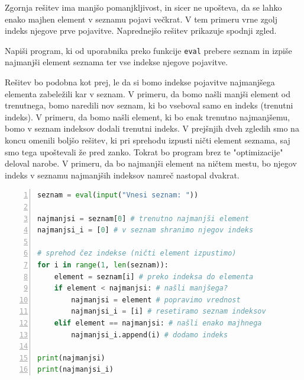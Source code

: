 Zgornja rešitev ima manjšo pomanjkljivost, in sicer ne upošteva, da se lahko enako majhen element v seznamu pojavi večkrat. V tem primeru vrne zgolj indeks njegove prve pojavitve. Naprednejšo rešitev prikazuje spodnji zgled.

\begin{zgled}
Napiši program, ki od uporabnika preko funkcije \texttt{eval} prebere seznam in izpiše najmanjši element seznama ter vse indekse njegove pojavitve. 
\end{zgled}
\begin{resitev}
Rešitev bo podobna kot prej, le da si bomo indekse pojavitve najmanjšega elementa zabeležili kar v seznam. V primeru, da bomo našli manjši element od trenutnega, bomo naredili nov seznam, ki bo vseboval samo en indeks (trenutni indeks). V primeru, da bomo našli element, ki bo enak trenutno najmanjšemu, bomo v seznam indeksov dodali trenutni indeks. V prejšnjih dveh zgledih smo na koncu omenili boljšo rešitev, ki pri sprehodu izpusti ničti element seznama, saj smo tega upoštevali že pred zanko. Tokrat bo program brez te "optimizacije" deloval narobe. V primeru, da bo najmanjši element na ničtem mestu, bo njegov indeks v seznamu najmanjših indeksov namreč nastopal dvakrat.
\begin{lstlisting}[language=Python,numbers=left]
seznam = eval(input("Vnesi seznam: "))

najmanjsi = seznam[0] # trenutno najmanjši element
najmanjsi_i = [0] # v seznam shranimo njegov indeks

# sprehod čez indekse (ničti element izpustimo)
for i in range(1, len(seznam)): 
    element = seznam[i] # preko indeksa do elementa
    if element < najmanjsi: # našli manjšega?
        najmanjsi = element # popravimo vrednost
        najmanjsi_i = [i] # resetiramo seznam indeksov
    elif element == najmanjsi: # našli enako majhnega
        najmanjsi_i.append(i) # dodamo indeks

print(najmanjsi)
print(najmanjsi_i)
\end{lstlisting}
\end{resitev}

